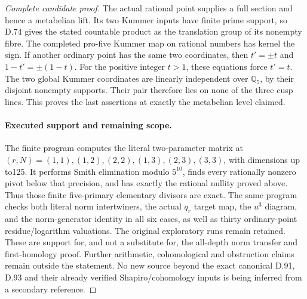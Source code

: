 \begin{proof}[Complete candidate proof]
The actual rational point supplies a full section and hence
a metabelian lift. Its two Kummer inputs have finite prime
support, so D.74 gives the stated countable product as the
translation group of its nonempty fibre. The completed
pro-five Kummer map on rational numbers has kernel the sign.
If another ordinary point has the same two coordinates,
then \(t'=\pm t\) and \(1-t'=\pm(1-t)\). For the positive
integer \(t>1\), these equations force \(t'=t\).
The two global Kummer coordinates are linearly independent
over \(\mathbb Q_5\), by their disjoint nonempty supports.
Their pair therefore lies on none of the three cusp lines.
This proves the last assertions at exactly the metabelian
level claimed.

\paragraph{Executed support and remaining scope.}
The finite program 
computes the literal two-parameter matrix at
\((r,N)=(1,1),(1,2),(2,2),(1,3),(2,3),(3,3)\), with dimensions
up to125. It performs Smith elimination modulo \(5^{10}\),
finds every rationally nonzero pivot below that precision,
and has exactly the rational nullity proved above. Thus those
finite five-primary elementary divisors are exact. The same program
checks both literal norm intertwiners, the actual \(q_r\) target
map, the \(u^3\) diagram, and the norm-generator identity in all
six cases, as well as thirty ordinary-point residue/logarithm
valuations. The original exploratory runs remain retained. These are
support for, and not a substitute for, the all-depth norm
transfer and first-homology proof. Further arithmetic,
cohomological and obstruction claims remain outside the
statement. No new source beyond the exact canonical D.91,
D.93 and their already verified Shapiro/cohomology inputs is
being inferred from a secondary reference.
\end{proof}
